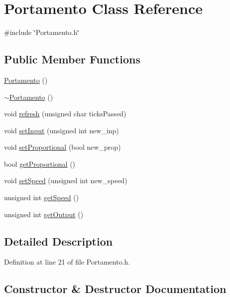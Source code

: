 \hypertarget{class_portamento}{}\section{Portamento Class Reference}
\label{class_portamento}


{\ttfamily \#include \char`\"{}Portamento.\+h\char`\"{}}

\subsection*{Public Member Functions}
\begin{DoxyCompactItemize}
\item 
\hyperlink{class_portamento_a80ed457562045ae8d49da317e6a7ba0d}{Portamento} ()
\item 
\hyperlink{class_portamento_a90f8e862c7a26ade2f7a955eea6da904}{$\sim$\+Portamento} ()
\item 
void \hyperlink{class_portamento_a4a5430c4e0561f9b37bbffdcbb936c43}{refresh} (unsigned char ticks\+Passed)
\item 
void \hyperlink{class_portamento_aa03a209b228dd0335cf103f1614d219a}{set\+Input} (unsigned int new\+\_\+inp)
\item 
void \hyperlink{class_portamento_aa28dcb234093a065e0970185eb107c78}{set\+Proportional} (bool new\+\_\+prop)
\item 
bool \hyperlink{class_portamento_a2cc6e550905558daac49cbef693c62fb}{get\+Proportional} ()
\item 
void \hyperlink{class_portamento_ac30ccb23ee5bc0dd6bb00215eb9f0805}{set\+Speed} (unsigned int new\+\_\+speed)
\item 
unsigned int \hyperlink{class_portamento_a6542d6becc564aaec446ec86104a8c2d}{get\+Speed} ()
\item 
unsigned int \hyperlink{class_portamento_ac9c42e58272962a5a7f7d0300ba2e595}{get\+Output} ()
\end{DoxyCompactItemize}


\subsection{Detailed Description}


Definition at line 21 of file Portamento.\+h.



\subsection{Constructor \& Destructor Documentation}
\mbox{\label{class_portamento_a80ed457562045ae8d49da317e6a7ba0d}} 
